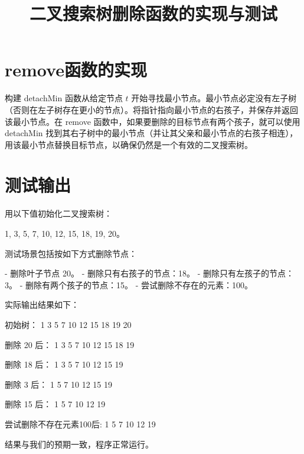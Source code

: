 \documentclass{article}
\title{二叉搜索树删除函数的实现与测试}
\author{}
\date{}
\begin{document}
\maketitle



\section{remove函数的实现}
构建 detachMin 函数从给定节点 \( t \) 开始寻找最小节点。最小节点必定没有左子树（否则在左子树存在更小的节点）。将指针指向最小节点的右孩子，并保存并返回该最小节点。在 remove 函数中，如果要删除的目标节点有两个孩子，就可以使用 detachMin 找到其右子树中的最小节点（并让其父亲和最小节点的右孩子相连），用该最小节点替换目标节点，以确保仍然是一个有效的二叉搜索树。

\section{测试输出}
用以下值初始化二叉搜索树： 

1,
3,
5,
7,
10,
12,
15,
18,
19,
20。

测试场景包括按如下方式删除节点：

- 删除叶子节点 20。
- 删除只有右孩子的节点：18。
- 删除只有左孩子的节点：3。
- 删除有两个孩子的节点：15。
- 尝试删除不存在的元素：100。

实际输出结果如下：

初始树：
1
3
5
7
10
12
15
18
19
20

删除 20 后：
1
3
5
7
10
12
15
18
19

删除 18 后：
1
3
5
7
10
12
15
19

删除 3 后：
1 
5 
7 
10 
12 
15 
19

删除 15 后：
1 
5 
7 
10 
12 
19 

尝试删除不存在元素100后:
1 
5 
7 
10 
12 
19 

结果与我们的预期一致，程序正常运行。
\end{document}
